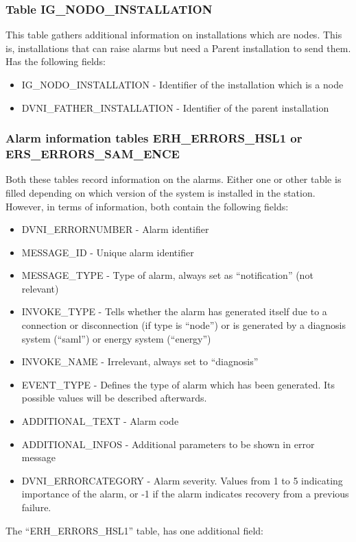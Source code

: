 \documentclass[a4paper,10pt]{report}
\begin{document}
\subsubsection*{Table IG\_NODO\_INSTALLATION}
This table gathers additional information on installations which are nodes. This is, installations that can raise alarms but need a Parent installation to send them. Has the following fields:
\begin{itemize}
 \item IG\_NODO\_INSTALLATION - Identifier of the installation which is a node
 \item DVNI\_FATHER\_INSTALLATION - Identifier of the parent installation
\end{itemize}

\subsubsection*{Alarm information tables ERH\_ERRORS\_HSL1 or ERS\_ERRORS\_SAM\_ENCE}
Both these tables record information on the alarms. Either one or other table is filled depending on which version of the system is installed in the station. However, in terms of information, both contain the following fields:
\begin{itemize}
 \item DVNI\_ERRORNUMBER - Alarm identifier
 \item MESSAGE\_ID - Unique alarm identifier
 \item MESSAGE\_TYPE - Type of alarm, always set as ``notification'' (not relevant)
 \item INVOKE\_TYPE - Tells whether the alarm has generated itself due to a connection or disconnection (if type is ``node'') or is generated by a diagnosis system (``saml'') or energy system (``energy'')
 \item INVOKE\_NAME - Irrelevant, always set to ``diagnosis''
 \item EVENT\_TYPE - Defines the type of alarm which has been generated. Its possible values will be described afterwards.
 \item ADDITIONAL\_TEXT - Alarm code
 \item ADDITIONAL\_INFOS - Additional parameters to be shown in error message
 \item DVNI\_ERRORCATEGORY - Alarm severity. Values from 1 to 5 indicating importance of the alarm, or -1 if the alarm indicates recovery from a previous failure.
\end{itemize}
The ``ERH\_ERRORS\_HSL1'' table, has one additional field:
\end{document}
